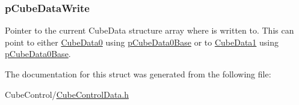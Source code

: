 \subsubsection[{p\+Cube\+Data\+Write}]{ p\+Cube\+Data\+Write}\label{structCubeControlData__t_a6ced180bdd8e8518a86f8f40888fddf2}
Pointer to the current Cube\+Data structure array where is written to. This can point to either \hyperlink{structCubeControlData__t_a1cf738638ac947d80a643d159c8eb2a2}{Cube\+Data0} using \hyperlink{CubeControlData_8c_ae726beefa78aea201161f0cf5744dcee}{p\+Cube\+Data0\+Base} or to \hyperlink{structCubeControlData__t_aed097662b3a0f9935e47ee9d209b8da0}{Cube\+Data1} using \hyperlink{CubeControlData_8c_ae726beefa78aea201161f0cf5744dcee}{p\+Cube\+Data0\+Base}. 

The documentation for this struct was generated from the following file\+:\begin{DoxyCompactItemize}
\item 
Cube\+Control/\hyperlink{CubeControlData_8h}{Cube\+Control\+Data.\+h}\end{DoxyCompactItemize}
